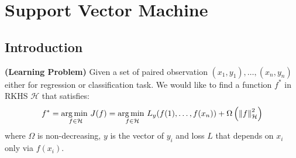 \section{Support Vector Machine}

\subsection{Introduction}

\begin{definition}{\textbf{(Learning Problem)}}
    Given a set of paired observation $(x_1,y_1),\dots,(x_n, y_n)$ either for regression or classification task. We would like to find a function $f^*$ in RKHS $\mathcal{H}$ that satisfies:
    \begin{equation*}
        f^*=\underset{f\in\mathcal{H}}{\arg\min \ }J(f) = \underset{f\in\mathcal{H}}{\arg\min \ }L_y(f(1),\dots,f(x_n)) + \Omega\left( \left\lVert f\right\rVert^2_\mathcal{H} \right)
    \end{equation*}
    where $\Omega$ is non-decreasing, $y$ is the vector of $y_i$ and loss $L$ that depends on $x_i$ only via $f(x_i)$.
\end{definition}

